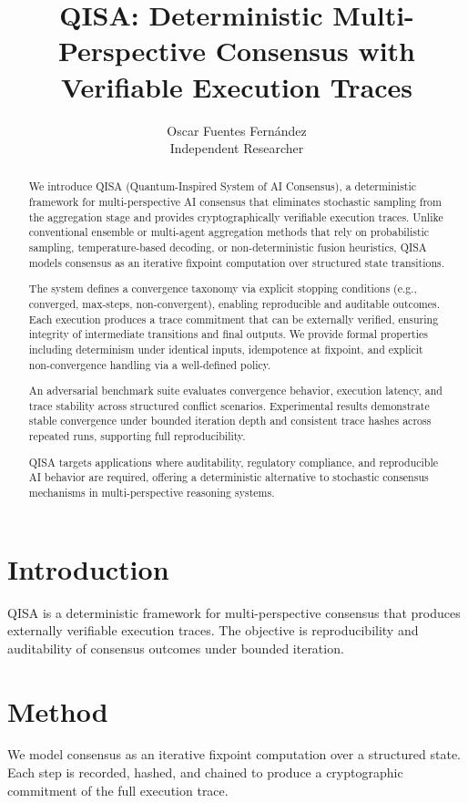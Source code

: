 \documentclass[11pt]{article}
\title{QISA: Deterministic Multi-Perspective Consensus with Verifiable Execution Traces}
\author{Oscar Fuentes Fern\'andez \\ Independent Researcher}
\date{}
\begin{document}
\maketitle

\begin{abstract}
We introduce QISA (Quantum-Inspired System of AI Consensus), a deterministic framework for multi-perspective AI consensus that eliminates stochastic sampling from the aggregation stage and provides cryptographically verifiable execution traces. Unlike conventional ensemble or multi-agent aggregation methods that rely on probabilistic sampling, temperature-based decoding, or non-deterministic fusion heuristics, QISA models consensus as an iterative fixpoint computation over structured state transitions.

The system defines a convergence taxonomy via explicit stopping conditions (e.g., converged, max-steps, non-convergent), enabling reproducible and auditable outcomes. Each execution produces a trace commitment that can be externally verified, ensuring integrity of intermediate transitions and final outputs. We provide formal properties including determinism under identical inputs, idempotence at fixpoint, and explicit non-convergence handling via a well-defined policy.

An adversarial benchmark suite evaluates convergence behavior, execution latency, and trace stability across structured conflict scenarios. Experimental results demonstrate stable convergence under bounded iteration depth and consistent trace hashes across repeated runs, supporting full reproducibility.

QISA targets applications where auditability, regulatory compliance, and reproducible AI behavior are required, offering a deterministic alternative to stochastic consensus mechanisms in multi-perspective reasoning systems.
\end{abstract}

\section{Introduction}
QISA is a deterministic framework for multi-perspective consensus that produces externally verifiable execution traces. The objective is reproducibility and auditability of consensus outcomes under bounded iteration.

\section{Method}
We model consensus as an iterative fixpoint computation over a structured state. Each step is recorded, hashed, and chained to produce a cryptographic commitment of the full execution trace.
\end{document}
